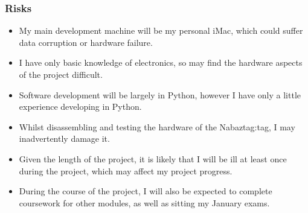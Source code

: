 \documentclass[12pt, a4paper]{article}
\begin{document}
			\subsubsection{Risks}
			\begin{itemize}[noitemsep]
				\item My main development machine will be my personal iMac, which could suffer data corruption or hardware failure. 
				\item I have only basic knowledge of electronics, so may find the hardware aspects of the project difficult. 
				\item Software development will be largely in Python, however I have only a little experience developing in Python.
				\item Whilst disassembling and testing the hardware of the Nabaztag:tag, I may inadvertently damage it.
				\item Given the length of the project, it is likely that I will be ill at least once during the project, which may affect my project progress.
				\item During the course of the project, I will also be expected to complete coursework for other modules, as well as sitting my January exams.
			\end{itemize}
			
\end{document}
